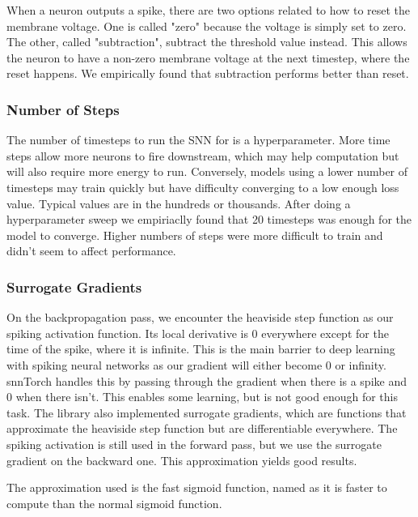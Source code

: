 \documentclass[../taasin.tex]{subfiles}
\begin{document}
When a neuron outputs a spike, there are two options related to how to reset the membrane voltage. One is called "zero" because the voltage is simply set to zero. The other, called "subtraction", subtract the threshold value instead. This allows the neuron to have a non-zero membrane voltage at the next timestep, where the reset happens. We empirically found that subtraction performs better than reset.

\subsubsection{Number of Steps}

The number of timesteps to run the SNN for is a hyperparameter. More time steps allow more neurons to fire downstream, which may help computation but will also require more energy to run. Conversely, models using a lower number of timesteps may train quickly but have difficulty converging to a low enough loss value. Typical values are in the hundreds or thousands. After doing a hyperparameter sweep we empiriaclly found that 20 timesteps was enough for the model to converge. Higher numbers of steps were more difficult to train and didn't seem to affect performance.



\subsubsection{Surrogate Gradients}

On the backpropagation pass, we encounter the heaviside step function as our spiking activation function. Its local derivative is 0 everywhere except for the time of the spike, where it is infinite. This is the main barrier to deep learning with spiking neural networks as our gradient will either become 0 or infinity. snnTorch handles this by passing through the gradient when there is a spike and 0 when there isn’t. This enables some learning, but is not good enough for this task. The library also implemented surrogate gradients, which are functions that approximate the heaviside step function but are differentiable everywhere. The spiking activation is still used in the forward pass, but we use the surrogate gradient on the backward one. This approximation yields good results.


The approximation used is the fast sigmoid function, named as it is faster to compute than the normal sigmoid function.
\end{document}
